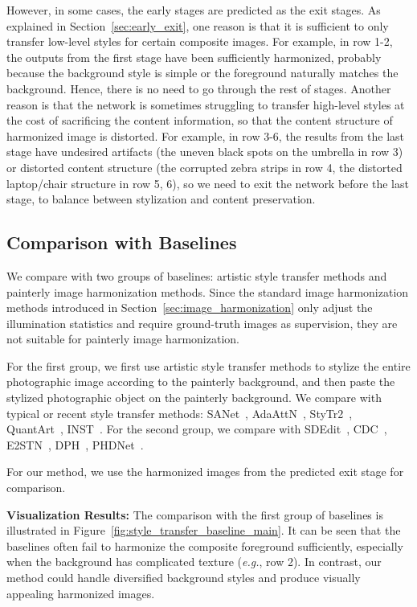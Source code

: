 \documentclass[letterpaper]{article} %
\begin{document}
However, in some cases, the early stages are predicted as the exit stages. As explained in Section~\ref{sec:early_exit},  one reason is that it is sufficient to only transfer low-level styles for certain composite images. For example, in row 1-2, the outputs from the first stage have been sufficiently harmonized, probably because the background style is simple or the foreground naturally matches the background. Hence, there is no need to go through the rest of stages.
Another reason is that the network is sometimes struggling to transfer high-level styles at the cost of sacrificing the content information, so that the content structure of harmonized image is distorted.
For example, in row 3-6, the results from the last stage have undesired artifacts (the uneven black spots on the umbrella in row 3) or distorted content structure (the corrupted zebra strips in row 4, the distorted laptop/chair structure in row 5, 6), so we need to exit the network before the last stage, to balance between stylization and content preservation.



\subsection{Comparison with Baselines}
We compare with two groups of baselines: artistic style transfer methods and painterly image harmonization methods.  Since the standard image harmonization methods introduced in Section~\ref{sec:image_harmonization} only adjust the illumination statistics and require ground-truth images as supervision, they are not suitable for painterly image harmonization.

For the first group, we first use artistic style transfer methods to stylize the entire photographic image according to the painterly background, and then paste the stylized photographic object on the painterly background.
We compare with typical or recent style transfer methods: SANet~\cite{park2019arbitrary}, AdaAttN~\cite{liu2021adaattn},  StyTr2~\cite{deng2022stytr2}, QuantArt~\cite{quantart}, INST~\cite{inst}.
For the second group, we compare with SDEdit~\cite{sdedit}, CDC~\cite{cdc}, E2STN~\cite{peng2019element}, DPH~\cite{luan2018deep}, PHDNet~\cite{cao2022painterly}.

For our method, we use the harmonized images from the predicted exit stage for comparison.

\textbf{Visualization Results: }The comparison with the first group of baselines is illustrated in Figure~\ref{fig:style_transfer_baseline_main}. It can be seen that the baselines often fail to harmonize the composite foreground sufficiently, especially when the background has complicated texture (\emph{e.g.}, row 2). In contrast, our method could handle diversified background styles and produce visually appealing harmonized images.
\end{document}

